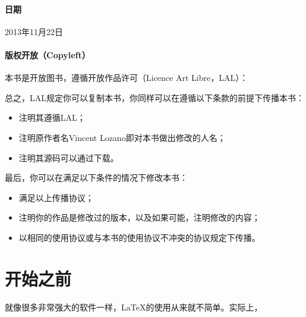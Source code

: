 \paragraph*{日期}2013年11月22日
\paragraph*{版权开放（Copyleft）}本书是开放图书，遵循开放作品许可（Licence Art Libre，LAL）：


总之，LAL规定你可以复制本书，你同样可以在遵循以下条款的前提下传播本书：

\begin{itemize}
    \item 注明其遵循LAL；
    \item 注明原作者名Vincent Lozano即对本书做出修改的人名；
    \item 注明其源码可以通过下载。
\end{itemize}

最后，你可以在满足以下条件的情况下修改本书：

\begin{itemize}
    \item 满足以上传播协议；
    \item 注明你的作品是修改过的版本，以及如果可能，注明修改的内容；
    \item 以相同的使用协议或与本书的使用协议不冲突的协议规定下传播。
\end{itemize}

\section*{开始之前}

就像很多非常强大的软件一样，\LaTeX 的使用从来就不简单。实际上，